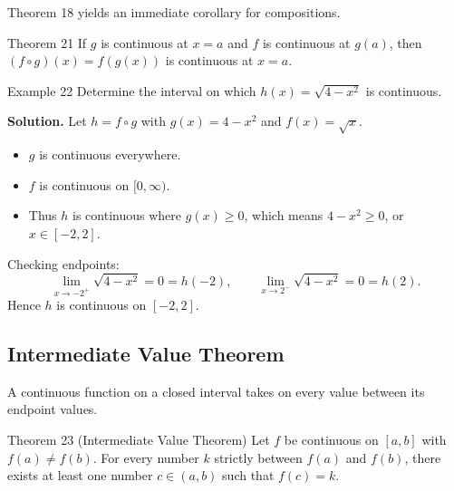 Theorem 18 yields an immediate corollary for compositions.

\begin{theorembox}{Theorem 21}
If \(g\) is continuous at \(x = a\) and \(f\) is continuous at \(g(a)\), then \((f \circ g)(x) = f(g(x))\) is continuous at \(x = a\).
\end{theorembox}

\begin{examplebox}{Example 22}
Determine the interval on which \(h(x) = \sqrt{4 - x^{2}}\) is continuous.

\medskip
\textbf{Solution.}
Let \(h = f \circ g\) with \(g(x) = 4 - x^{2}\) and \(f(x) = \sqrt{x}\).
\begin{itemize}
    \item \(g\) is continuous everywhere.
    \item \(f\) is continuous on \([0, \infty)\).
    \item Thus \(h\) is continuous where \(g(x) \ge 0\), which means \(4 - x^{2} \ge 0\), or \(x \in [-2, 2]\).
\end{itemize}
Checking endpoints:
\[
\lim_{x \to -2^{+}} \sqrt{4 - x^{2}} = 0 = h(-2), \qquad
\lim_{x \to 2^{-}} \sqrt{4 - x^{2}} = 0 = h(2).
\]
Hence \(h\) is continuous on \([-2, 2]\).
\end{examplebox}


\subsection*{Intermediate Value Theorem}
\label{subsec:1.5.5}


A continuous function on a closed interval takes on every value between its endpoint values.

\begin{theorembox}{Theorem 23 (Intermediate Value Theorem)}
Let \(f\) be continuous on \([a, b]\) with \(f(a) \neq f(b)\). For every number \(k\) strictly between \(f(a)\) and \(f(b)\), there exists at least one number \(c \in (a, b)\) such that \(f(c) = k\).
\end{theorembox}

